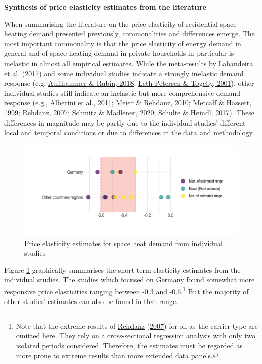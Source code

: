 \documentclass[12pt,twoside]{reedthesis}
\begin{document}
\textbf{Synthesis of price elasticity estimates from the literature}

When summarising the literature on the price elasticity of residential space heating demand presented previously, commonalities and differences emerge. The most important commonality is that the price elasticity of energy demand in general and of space heating demand in private households in particular is inelastic in almost all empirical estimates. While the meta-results by \protect\hyperlink{ref-labandeira_etal17}{Labandeira et al.} (\protect\hyperlink{ref-labandeira_etal17}{2017}) and some individual studies indicate a strongly inelastic demand response (e.g. \protect\hyperlink{ref-auffhammer_rubin18}{Auffhammer \& Rubin, 2018}; \protect\hyperlink{ref-leth-petersen_togeby01}{Leth-Petersen \& Togeby, 2001}), other individual studies still indicate an inelastic but more comprehensive demand response (e.g., \protect\hyperlink{ref-alberini_etal11}{Alberini et al., 2011}; \protect\hyperlink{ref-meier_rehdanz10}{Meier \& Rehdanz, 2010}; \protect\hyperlink{ref-metcalf_hassett99}{Metcalf \& Hassett, 1999}; \protect\hyperlink{ref-rehdanz07}{Rehdanz, 2007}; \protect\hyperlink{ref-schmitz_madlener20}{Schmitz \& Madlener, 2020}; \protect\hyperlink{ref-schulte_heindl17}{Schulte \& Heindl, 2017}). These differences in magnitude may be partly due to the individual studies' different local and temporal conditions or due to differences in the data and methodology.
\begin{figure}

{\centering \includegraphics[width=1\linewidth]{figure/plot_literature_estimates} 

}

\caption{Price elasticity estimates for space heat demand from individual studies}\label{fig:literature-estimates-plot}
\end{figure}
Figure \ref{fig:literature-estimates-plot} graphically summarises the short-term elasticity estimates from the individual studies. The studies which focused on Germany found somewhat more responsive price elasticities ranging between -0.3 and -0.6.\footnote{Note that the extreme results of \protect\hyperlink{ref-rehdanz07}{Rehdanz} (\protect\hyperlink{ref-rehdanz07}{2007}) for oil as the carrier type are omitted here. They rely on a cross-sectional regression analysis with only two isolated periods considered. Therefore, the estimates must be regarded as more prone to extreme results than more extended data panels.} But the majority of other studies' estimates can also be found in that range.
\end{document}
